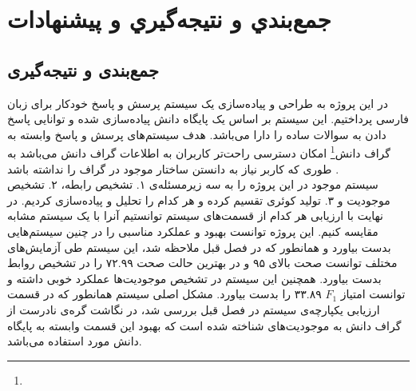 \chapter{جمع‌بندي و نتيجه‌گيري و پیشنهادات}

\section{جمع‌بندی و نتیجه‌گیری}
در این پروژه به طراحی و پیاده‌سازی یک سیستم پرسش و پاسخ خودکار برای زبان فارسی پرداختیم. این سیستم بر اساس یک پایگاه دانش پیاده‌سازی شده و توانایی پاسخ دادن به سوالات ساده را دارا می‌باشد. هدف سیستم‌های پرسش و پاسخ وابسته به گراف دانش\footnote{} امکان دسترسی راحت‌تر کاربران به اطلاعات گراف دانش می‌باشد به طوری که کاربر نیاز به دانستن ساختار موجود در گراف را نداشته باشد \cite{huang2019KGembedding}. \\
سیستم موجود در این پروژه را به سه زیرمسئله‌ی ۱. تشخیص رابطه، ۲. تشخیص موجودیت و ۳. تولید کوئری تقسیم کرده و هر کدام را تحلیل و پیاده‌سازی کردیم. در نهایت با ارزیابی هر کدام از قسمت‌های سیستم توانستیم آنرا با یک سیستم مشابه مقایسه کنیم. این پروژه توانست بهبود و عملکرد مناسبی را در چنین سیستم‌هایی بدست بیاورد و همانطور که در فصل قبل ملاحظه شد، این سیستم طی آزمایش‌های مختلف توانست صحت بالای ۹۵\lr{\%} و در بهترین حالت صحت ۷۲.۹۹\lr{\%} را در تشخیص روابط بدست بیاورد. همچنین این سیستم در تشخیص موجودیت‌ها عملکرد خوبی داشته و توانست امتیاز $F_{1}$ ۳۳.۸۹\lr{\%} را بدست بیاورد. مشکل اصلی سیستم همانطور که در قسمت ارزیابی یکپارچه‌ی سیستم در فصل قبل بررسی شد، در نگاشت گره‌ی نادرست از گراف دانش به موجودیت‌های شناخته شده است که بهبود این قسمت وابسته به پایگاه دانش مورد استفاده می‌باشد.
